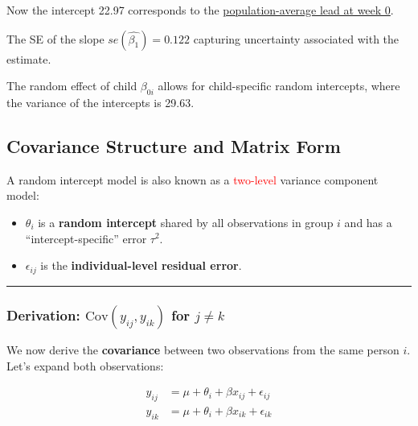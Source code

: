 \documentclass[
  letterpaper,
  DIV=11,
  numbers=noendperiod]{scrreprt}
\begin{document}
Now the intercept 22.97 corresponds to the \ul{population-average lead
at week 0}.

The SE of the slope \(se(\hat{\beta_1}) = 0.122\) capturing uncertainty
associated with the estimate.

The random effect of child \(\beta_{0i}\) allows for child-specific
random intercepts, where the variance of the intercepts is 29.63.

\hypertarget{covariance-structure-and-matrix-form}{%
\subsection*{Covariance Structure and Matrix
Form}\label{covariance-structure-and-matrix-form}}

A random intercept model is also known as a \textcolor{red}{two-level}
variance component model:

\begin{itemize}
\item
  \(\theta_i\) is a \textbf{random intercept} shared by all observations
  in group \(i\) and has a ``intercept-specific'' error \(\tau^2\).
\item
  \(\epsilon_{ij}\) is the \textbf{individual-level residual error}.
\end{itemize}

\begin{center}\rule{0.5\linewidth}{0.5pt}\end{center}

\hypertarget{derivation-textcovy_ij-y_ik-for-j-ne-k}{%
\subsubsection*{\texorpdfstring{Derivation:
\(\text{Cov}(y_{ij}, y_{ik})\) for
\(j \ne k\)}{Derivation: \textbackslash text\{Cov\}(y\_\{ij\}, y\_\{ik\}) for j \textbackslash ne k}}\label{derivation-textcovy_ij-y_ik-for-j-ne-k}}

We now derive the \textbf{covariance} between two observations from the
same person \(i\). Let's expand both observations:

\[
\begin{aligned}
y_{ij} &= \mu + \theta_i + \beta x_{ij} + \epsilon_{ij} \\
y_{ik} &= \mu + \theta_i + \beta x_{ik} + \epsilon_{ik}
\end{aligned}
\]
\end{document}
